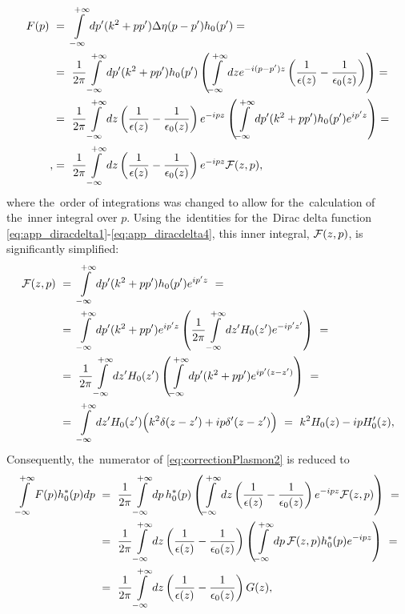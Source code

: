 \begin{equation}
\begin{aligned}
F(p)~&=~\int\limits_{-\infty}^{+\infty} dp'(k^2+pp')\Delta\eta(p-p')h_0(p') = \\
&=~\frac{1}{2\pi}\int\limits_{-\infty}^{+\infty}dp' (k^2+pp')h_0(p')\left(\int\limits_{-\infty}^{+\infty}dz e^{-i(p-p')z}\left(\frac{1}{\epsilon(z)}-\frac{1}{\epsilon_0(z)}\right)\right) = \\
&=~\frac{1}{2\pi}\int\limits_{-\infty}^{+\infty}dz \left(\frac{1}{\epsilon(z)}-\frac{1}{\epsilon_0(z)}\right)e^{-ipz} \left(\int\limits_{-\infty}^{+\infty}dp' (k^2+pp')h_0(p') e^{ip'z}\right) = \\,
&=~\frac{1}{2\pi}\int\limits_{-\infty}^{+\infty}dz \left(\frac{1}{\epsilon(z)}-\frac{1}{\epsilon_0(z)}\right)e^{-ipz} {\mathcal F}(z,p),
\end{aligned}
\end{equation}
where the~order of integrations was changed to allow for the~calculation of the~inner integral over $p$. Using the~identities for the~Dirac delta function \cref{eq:app_diracdelta1}-\cref{eq:app_diracdelta4}, this inner integral, ${\mathcal F}(z,p)$, is significantly simplified:
\begin{align}
{\mathcal F}(z,p)~&=~\int\limits_{-\infty}^{+\infty}dp' (k^2+pp')h_0(p') e^{ip'z}~= \\
&=~\int\limits_{-\infty}^{+\infty}dp' (k^2+pp')e^{ip'z}\left(\frac{1}{2\pi}\int\limits_{-\infty}^{+\infty}dz'H_0(z')e^{-ip'z'}\right)~=\notag\\
&=~\frac{1}{2\pi} \int\limits_{-\infty}^{+\infty} dz' H_0(z')\left(\int\limits_{-\infty}^{+\infty} dp' (k^2+pp')e^{ip'(z-z')}\right)~=\notag\\
&=~\int\limits_{-\infty}^{+\infty} dz' H_0(z')\Big(k^2\delta(z-z')+i p \delta'(z-z')\Big)~=~k^2 H_0(z)-ip H_0'(z),\notag
\end{align}
Consequently, the~numerator of \cref{eq:correctionPlasmon2} is reduced to
\begin{equation}
\begin{aligned}
\int\limits_{-\infty}^{+\infty} F(p)h_0^*(p)dp~&=~\frac{1}{2\pi}\int\limits_{-\infty}^{+\infty} dp\,h_0^*(p) \left( \int\limits_{-\infty}^{+\infty}dz \left(\frac{1}{\epsilon(z)}-\frac{1}{\epsilon_0(z)}\right)e^{-ipz} {\mathcal F}(z,p)\right)~= \\
&=~\frac{1}{2\pi} \int\limits_{-\infty}^{+\infty}dz \left(\frac{1}{\epsilon(z)}-\frac{1}{\epsilon_0(z)}\right) \left( \int\limits_{-\infty}^{+\infty} dp\,{\mathcal F}(z,p) h_0^*(p) e^{-ipz}\right)~= \\
&=~\frac{1}{2\pi} \int\limits_{-\infty}^{+\infty}dz \left(\frac{1}{\epsilon(z)}-\frac{1}{\epsilon_0(z)}\right) G(z),
\end{aligned}
\end{equation}
